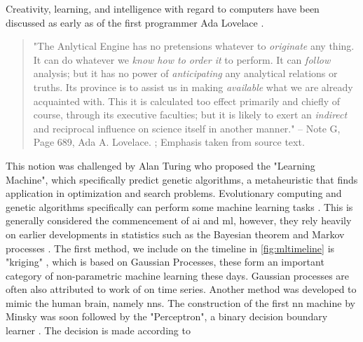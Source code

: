 Creativity, learning, and intelligence with regard to computers have been discussed as early as of the first programmer Ada Lovelace \citep{taylor1843scientific}.

\begin{quote}
    "The Anlytical Engine has no pretensions whatever to \textit{originate} any thing. It can do whatever we \textit{know how to order it} to perform. It can \textit{follow} analysis; but it has no power of \textit{anticipating} any analytical relations or truths. Its province is to assist us in making \textit{available} what we are already acquainted with. This it is calculated too effect primarily and chiefly of course, through its executive faculties; but it is likely to exert an \textit{indirect} and reciprocal influence on science itself in another manner." -- Note G, Page 689, Ada A. Lovelace. \citep{taylor1843scientific}; Emphasis taken from source text.
\end{quote}

This notion was challenged by Alan Turing \citep{turing1950} who proposed the "Learning Machine", which specifically predict genetic algorithms, a metaheuristic that finds application in optimization and search problems. Evolutionary computing and genetic algorithms specifically can perform some machine learning tasks \citep{Goldberg1988-ch}. This is generally considered the commencement of \ac{ai} and \ac{ml}, however, they rely heavily on earlier developments in statistics such as the Bayesian theorem \citep{bayes1763lii} and Markov processes \citep{markov1906rasprostranenie,markov1971extension}. The first method, we include on the timeline in \cref{fig:mltimeline} is "kriging" \citep{Krige1951}, which is based on Gaussian Processes, these form an important category of non-parametric machine learning these days. Gaussian processes are often also attributed to work of \citet{kolmogorov1939interpolation} on time series. Another method was developed to mimic the human brain, namely \acfp{nn}. The construction of the first \ac{nn} machine by Minsky \citep{russelnorvig} was soon followed by the "Perceptron", a binary decision boundary learner \citep{rosenblatt1958perceptron}. The decision is made according to

